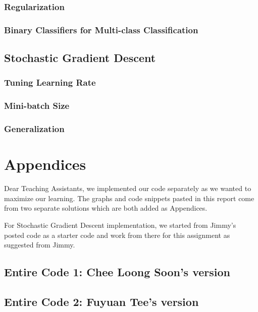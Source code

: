 \documentclass[a4paper,12pt]{article}
\begin{document}
\subsubsection{Regularization}
\subsubsection{Binary Classifiers for Multi-class Classification}
\subsection{Stochastic Gradient Descent}
\subsubsection{Tuning Learning Rate}
\subsubsection{Mini-batch Size}
\subsubsection{Generalization}
\section{Appendices}
Dear Teaching Assistants, 
we implemented our code separately as we wanted to maximize our learning. The graphs and code snippets pasted in this report come from two separate solutions which are both added as Appendices. 

For Stochastic Gradient Descent implementation, we started from Jimmy's posted code as a starter code and work from there for this assignment as suggested from Jimmy. 

\subsection{Entire Code 1: Chee Loong Soon's version}
\subsection{Entire Code 2: Fuyuan Tee's version}
\end{document}
